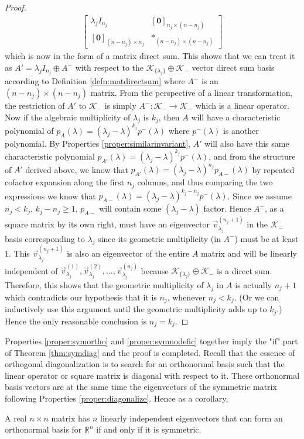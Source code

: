 \begin{proof}
\begin{align*}
\begin{bmatrix}
\lambda_j I_{n_j} & [\textbf{0}]_{n_j\times(n-n_j)} \\
[\textbf{0}]_{(n-n_j)\times n_j} & *_{(n-n_j)\times(n-n_j)}
\end{bmatrix}
\end{align*}
which is now in the form of a matrix direct sum. This shows that we can treat it as $A' = \lambda_j I_{n_j} \oplus A^-$ with respect to the $\mathcal{K}_{\{\lambda_j\}} \oplus \mathcal{K}_{-}$ vector direct sum basis according to Definition \ref{defn:matdirectsum} where $A^-$ is an $(n-n_j)\times(n-n_j)$ matrix. From the perspective of a linear transformation, the restriction of $A'$ to $\mathcal{K}_{-}$ is simply $A^-: \mathcal{K}_{-} \to \mathcal{K}_{-}$ which is a linear operator. Now if the algebraic multiplicity of $\lambda_j$ is $k_j$, then $A$ will have a characteristic polynomial of $p_A(\lambda) = (\lambda_j-\lambda)^{k_j} p^-(\lambda)$ where $p^-(\lambda)$ is another polynomial. By Properties \ref{proper:similarinvariant}, $A'$ will also have this same characteristic polynomial $p_{A'}(\lambda) = (\lambda_j-\lambda)^{k_j} p^-(\lambda)$, and from the structure of $A'$ derived above, we know that $p_{A'}(\lambda) = (\lambda_j-\lambda)^{n_j} p_{A-}(\lambda)$ by repeated cofactor expansion along the first $n_j$ columns, and thus comparing the two expressions we know that $p_{A-}(\lambda) = (\lambda_j-\lambda)^{k_j - n_j}p^-(\lambda)$. Since we assume $n_j < k_j$, $k_j - n_j \geq 1$, $p_{A-}$ will contain some $(\lambda_j-\lambda)$ factor. Hence $A^-$, as a square matrix by its own right, must have an eigenvector $\vec{v}^{(n_j+1)}_{\lambda_j}$ in the $\mathcal{K}_{-}$ basis corresponding to $\lambda_j$ since its geometric multiplicity (in $A^-$) must be at least $1$. This $\vec{v}^{(n_j+1)}_{\lambda_j}$ is also an eigenvector of the entire $A$ matrix and will be linearly independent of $\vec{v}^{(1)}_{\lambda_j}, \vec{v}^{(2)}_{\lambda_j}, \ldots, \vec{v}^{(n_j)}_{\lambda_j}$ because $\mathcal{K}_{\{\lambda_j\}} \oplus \mathcal{K}_{-}$ is a direct sum. Therefore, this shows that the geometric multiplicity of $\lambda_j$ in $A$ is actually $n_j+1$ which contradicts our hypothesis that it is $n_j$, whenever $n_j < k_j$. (Or we can inductively use this argument until the geometric multiplicity adds up to $k_j$.) Hence the only reasonable conclusion is $n_j = k_j$. 
\end{proof}
\par
Properties \ref{proper:symortho} and \ref{proper:symnodefic} together imply the "if" part of Theorem \ref{thm:symdiag} and the proof is completed. Recall that the essence of orthogonal diagonalization is to search for an orthonormal basis such that the linear operator or square matrix is diagonal with respect to it. These orthonormal basis vectors are at the same time the eigenvectors of the symmetric matrix following Properties \ref{proper:diagonalize}. Hence as a corollary,
\begin{proper}
\label{proper:orthobasissym}
A real $n \times n$ matrix has $n$ linearly independent eigenvectors that can form an orthonormal basis for $\mathbb{R}^n$ if and only if it is symmetric.
\end{proper}

